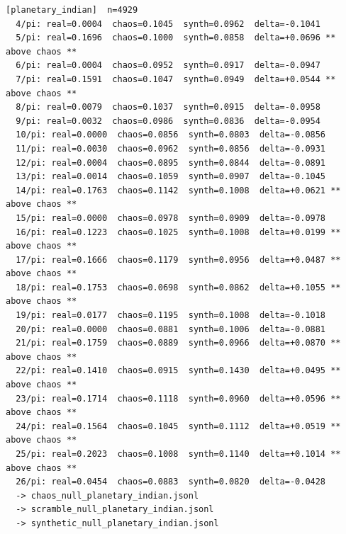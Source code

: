 \documentclass[11pt, letterpaper, openany]{book}
\begin{document}
\begin{empiricalbox}
\begin{lstlisting}[style=terminal]
[planetary_indian]  n=4929
  4/pi: real=0.0004  chaos=0.1045  synth=0.0962  delta=-0.1041
  5/pi: real=0.1696  chaos=0.1000  synth=0.0858  delta=+0.0696 ** above chaos **
  6/pi: real=0.0004  chaos=0.0952  synth=0.0917  delta=-0.0947
  7/pi: real=0.1591  chaos=0.1047  synth=0.0949  delta=+0.0544 ** above chaos **
  8/pi: real=0.0079  chaos=0.1037  synth=0.0915  delta=-0.0958
  9/pi: real=0.0032  chaos=0.0986  synth=0.0836  delta=-0.0954
  10/pi: real=0.0000  chaos=0.0856  synth=0.0803  delta=-0.0856
  11/pi: real=0.0030  chaos=0.0962  synth=0.0856  delta=-0.0931
  12/pi: real=0.0004  chaos=0.0895  synth=0.0844  delta=-0.0891
  13/pi: real=0.0014  chaos=0.1059  synth=0.0907  delta=-0.1045
  14/pi: real=0.1763  chaos=0.1142  synth=0.1008  delta=+0.0621 ** above chaos **
  15/pi: real=0.0000  chaos=0.0978  synth=0.0909  delta=-0.0978
  16/pi: real=0.1223  chaos=0.1025  synth=0.1008  delta=+0.0199 ** above chaos **
  17/pi: real=0.1666  chaos=0.1179  synth=0.0956  delta=+0.0487 ** above chaos **
  18/pi: real=0.1753  chaos=0.0698  synth=0.0862  delta=+0.1055 ** above chaos **
  19/pi: real=0.0177  chaos=0.1195  synth=0.1008  delta=-0.1018
  20/pi: real=0.0000  chaos=0.0881  synth=0.1006  delta=-0.0881
  21/pi: real=0.1759  chaos=0.0889  synth=0.0966  delta=+0.0870 ** above chaos **
  22/pi: real=0.1410  chaos=0.0915  synth=0.1430  delta=+0.0495 ** above chaos **
  23/pi: real=0.1714  chaos=0.1118  synth=0.0960  delta=+0.0596 ** above chaos **
  24/pi: real=0.1564  chaos=0.1045  synth=0.1112  delta=+0.0519 ** above chaos **
  25/pi: real=0.2023  chaos=0.1008  synth=0.1140  delta=+0.1014 ** above chaos **
  26/pi: real=0.0454  chaos=0.0883  synth=0.0820  delta=-0.0428
  -> chaos_null_planetary_indian.jsonl
  -> scramble_null_planetary_indian.jsonl
  -> synthetic_null_planetary_indian.jsonl


\end{lstlisting}
\end{empiricalbox}
\end{document}

